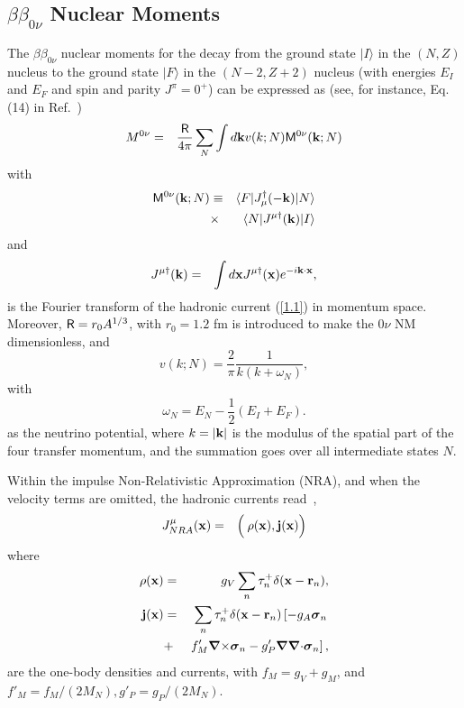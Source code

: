 \documentclass[nofootinbib,twocolumn,eqsecnum,floats,aps]{revtex4}
\def\xb {{\bf x}}
\def\kb {{\bf k}}
\def\nn{\nonumber }
\def\mbs{\mbox{\boldmath$\sigma$}}
\def\x{\times}
\def\nn{\nonumber }
\def\br{\begin{eqnarray}}
\def\er{\end{eqnarray}}
\def\xb {{\bf x}}
\def\jb{ {\bf j}}
\def\mbs{\mbox{\boldmath$\sigma$}}
\def\bra#1{\langle #1|}
\def\ket#1{|#1 \rangle}
\def\rf#1{{(\ref{#1})}}
\def\b {{\beta}}
\begin{document}
\subsection{$\beta\beta_{0\nu}$ Nuclear  Moments}\label{Sec2A}
The $\b\b_{0\nu}$ nuclear moments for the decay from the ground
state $\ket{I}$ in the $(N,Z)$ nucleus to the ground state
$\ket{F}$ in the $(N-2,Z+2)$ nucleus (with energies $E_I$ and
$E_F$ and spin and parity $J^{\pi}=0^+$) can be expressed as
 (see, for instance, Eq. (14)  in Ref.~\cite{Bar98})
\br
M^{0\nu}
&=&\frac{{\sf R}}{4\pi}\sum_{N}\int d{\bf k}v(k;N)
{\sf M}^{0\nu}(\kb;N)
\label{2.1}\end{eqnarray}
with
\br
{\sf M}^{0\nu}(\kb;N)
&\equiv&\bra{F} J^\dagger_\mu(-{\kb})\ket{N}
\nn\\
&\x&\bra{N}
 J^{\mu\dagger}{(\kb})\ket{I}
\label{2.2}\end{eqnarray}
and
\br J^{\mu\dagger}{(\kb})&=&\int
d{\bf x}J^{\mu\dagger}{(\xb}) e^{-i{\bf k}\cdot{\bf x}},
\label{2.3}\er
is the Fourier transform of the hadronic current
\rf{1.1} in momentum space.
Moreover,  ${\sf R}= r_0A^{1/3}$, with $r_0 = 1.2$ fm is introduced to make
the $0\nu$ NM dimensionless, and
\begin{equation}
v(k;N)=\frac{2}{\pi}\frac{1}{k(k+\omega_N)},
\label{2.4}\end{equation}
with
\begin{equation}
\omega_N=E_N-\frac{1}{2}\left(E_{I} +E_{F}\right).
\label{2.5}\end{equation}
as the neutrino potential, where $k=|\kb|$ is the modulus of the spatial part of the four
transfer momentum, and the summation  goes over all intermediate states $N$.

Within the  impulse  Non-Relativistic Approximation (NRA), and when the velocity
terms are omitted, the hadronic currents
read~\cite{Bar98,Bar99a,Bar99,Boh69,Wal95},
\begin{eqnarray}
J_{NRA}^{\mu}({\bf x})&=&\left(\frac{}{}\rho({\xb}),
{\jb}({\xb})\right)
\label{2.6}\end{eqnarray}
where
\begin{eqnarray}
\rho({\bf x})&=&g_V\sum_n\tau_n^+
\delta({\bf x}-{\bf r}_n),
\nn\\
\jb({\bf x})&=&\sum_n\tau_n^+
\delta({\bf x}-{\bf r}_n)\left[-g_A\mbs_n\right.
\nn\\
&+&\left.f'_M{\mbox{\boldmath$\nabla$}}{\times}\mbs_n
-g'_P{\mbox{\boldmath$\nabla$}}
{\mbox{\boldmath$\nabla$}}{\cdot}\mbs_n\right],
\label{2.7}\end{eqnarray}
are the one-body  densities and currents, with
$f_M=g_V+g_M$, and $f'_M=f_M/(2M_N), g'_P=g_P/(2M_N)$.
\end{document}
